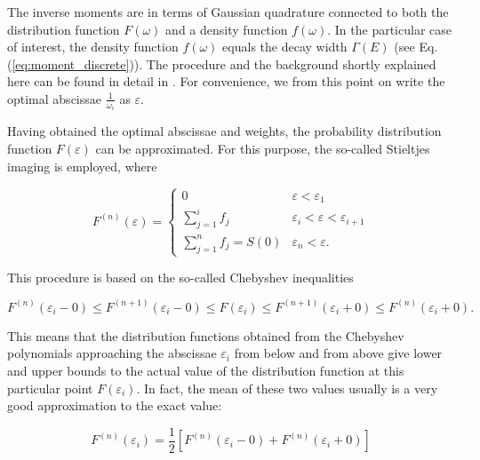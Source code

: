 The inverse moments are in terms of Gaussian quadrature
connected to both the distribution function
$F(\omega)$ and a density function $f(\omega)$. In the particular case of
interest, the density function $f(\omega)$ equals the decay width $\Gamma(E)$
(see Eq. (\ref{eq:moment_discrete})).
The procedure and the background shortly
explained here can be found in detail in \cite{Reinhardt79,
MuellerPlathe89,Corcoran77,Langhoff76}. For convenience, we from this point
on write the optimal abscissae $\frac{1}{\omega_i}$ as $\varepsilon$.

Having obtained the optimal abscissae and weights, the probability
distribution function
$F(\varepsilon)$ can be approximated. For this purpose, the so-called Stieltjes imaging
is employed, where

\begin{equation}
  F^{(n)} (\varepsilon) =
  \begin{cases}
    0                                & \varepsilon   < \varepsilon_1\\
    \sum\limits_{j=1}^{i} f_j        & \varepsilon_i < \varepsilon < \varepsilon_{i+1}\\
    \sum\limits_{j=1}^{n} f_j = S(0) & \varepsilon_n < \varepsilon .
  \end{cases}
\end{equation}
                                                                  
This procedure is based on the so-called Chebyshev inequalities
                                                                  
\begin{equation} \label{equation:Chebyshev_inequalities}          
  F^{(n)}(\varepsilon_i - 0) \le F^{(n+1)}(\varepsilon_i - 0) \le F(\varepsilon_i)
  \le F^{(n+1)}(\varepsilon_i + 0) \le F^{(n)}(\varepsilon_i + 0).          
\end{equation}                                                    
                                                                  
This means that the distribution functions obtained from the Chebyshev
polynomials approaching the abscissae $\varepsilon_i$ from below
and from above      
give lower and upper bounds to the actual value of the distribution
function at this particular point $F(\varepsilon_i)$. In fact, the mean of these     
two values usually is a very good approximation to the exact value:

\begin{equation}                                                  
  F^{(n)} (\varepsilon_i) = \frac 12 \left[ F^{(n)} (\varepsilon_i - 0)     
                       + F^{(n)} (\varepsilon_i+0) \right]             
\end{equation}                                                    
                                                                  
